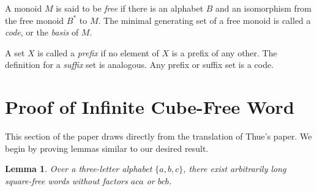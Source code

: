 \documentclass[letterpaper,12pt]{article}
\newtheorem{lem}[thm]{Lemma}
\begin{document}
A monoid $M$ is said to be \emph{free} if there is an alphabet $B$ and an isomorphism from the free monoid $B^*$ to $M$. The minimal generating set of a free monoid is called a \emph{code}, or the \emph{basis} of $M$.

A set $X$ is called a \emph{prefix} if no element of $X$ is a prefix of any other. The definition for a \emph{suffix} set is analogous. Any prefix or suffix set is a code.

\section{Proof of Infinite Cube-Free Word}

This section of the paper draws directly from the translation of Thue's paper. 
We begin by proving lemmas similar to our desired result.

\begin{lem} \label{lem:acabcb}
Over a three-letter alphabet $\{a,b,c\}$, there exist arbitrarily 
long square-free words without factors $aca$ or $bcb$.
\end{lem}
\end{document}
